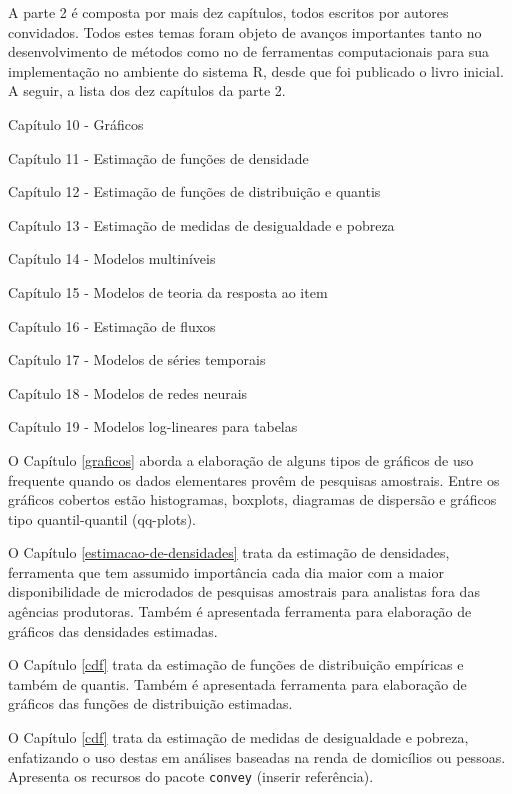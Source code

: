 \documentclass[
  12pt,
  brazilian,
]{book}
\theoremstyle{definition}
\theoremstyle{definition}
\theoremstyle{definition}
\theoremstyle{definition}
\theoremstyle{remark}
\begin{document}
A parte 2 é composta por mais dez capítulos, todos escritos por autores convidados. Todos estes temas foram objeto de avanços importantes tanto no desenvolvimento de métodos como no de ferramentas computacionais para sua implementação no ambiente do sistema R, desde que foi publicado o livro inicial. A seguir, a lista dos dez capítulos da parte 2.

Capítulo 10 - Gráficos

Capítulo 11 - Estimação de funções de densidade

Capítulo 12 - Estimação de funções de distribuição e quantis

Capítulo 13 - Estimação de medidas de desigualdade e pobreza

Capítulo 14 - Modelos multiníveis

Capítulo 15 - Modelos de teoria da resposta ao item

Capítulo 16 - Estimação de fluxos

Capítulo 17 - Modelos de séries temporais

Capítulo 18 - Modelos de redes neurais

Capítulo 19 - Modelos log-lineares para tabelas

O Capítulo \ref{graficos} aborda a elaboração de alguns tipos de gráficos de uso frequente quando os dados elementares provêm de pesquisas amostrais. Entre os gráficos cobertos estão histogramas, boxplots, diagramas de dispersão e gráficos tipo quantil-quantil (qq-plots).

O Capítulo \ref{estimacao-de-densidades} trata da estimação de densidades, ferramenta que tem assumido importância cada dia maior com a maior disponibilidade de microdados de pesquisas amostrais para analistas fora das agências produtoras. Também é apresentada ferramenta para elaboração de gráficos das densidades estimadas.

O Capítulo \ref{cdf} trata da estimação de funções de distribuição empíricas e também de quantis. Também é apresentada ferramenta para elaboração de gráficos das funções de distribuição estimadas.

O Capítulo \ref{cdf} trata da estimação de medidas de desigualdade e pobreza, enfatizando o uso destas em análises baseadas na renda de domicílios ou pessoas. Apresenta os recursos do pacote \texttt{convey} (inserir referência).
\end{document}
